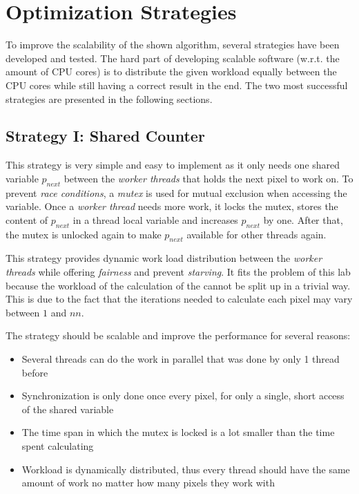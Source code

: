 \section{Optimization Strategies}
\label{sec:strategies}

To improve the scalability of the shown algorithm, several strategies have been developed and tested. The hard part of developing scalable software (w.r.t. the amount of CPU cores) is to distribute the given workload equally between the CPU cores while still having a correct result in the end. The two most successful strategies are presented in the following sections.

\subsection{Strategy I: Shared Counter}
\label{ssec:strategy-i}

This strategy is very simple and easy to implement as it only needs one shared variable $p_{next}$ between the \textit{worker threads} that holds the next pixel to work on. To prevent \textit{race conditions}, a \textit{mutex} is used for mutual exclusion when accessing the variable. Once a \textit{worker thread} needs more work, it locks the mutex, stores the content of $p_{next}$ in a thread local variable and increases $p_{next}$ by one. After that, the mutex is unlocked again to make $p_{next}$ available for other threads again.

This strategy provides dynamic work load distribution between the \textit{worker threads} while offering \textit{fairness} and prevent \textit{starving}. It fits the problem of this lab because the workload of the calculation of the \ms{} cannot be split up in a trivial way. This is due to the fact that the iterations needed to calculate each pixel may vary between $1$ and $nn$.

\noindent The strategy should be scalable and improve the performance for several reasons:
\begin{itemize}
    \item Several threads can do the work in parallel that was done by only 1 thread before
    \item Synchronization is only done once every pixel, for only a single, short access of the shared variable
    \item The time span in which the mutex is locked is a lot smaller than the time spent calculating
    \item Workload is dynamically distributed, thus every thread should have the same amount of work no matter how many pixels they work with
\end{itemize}



